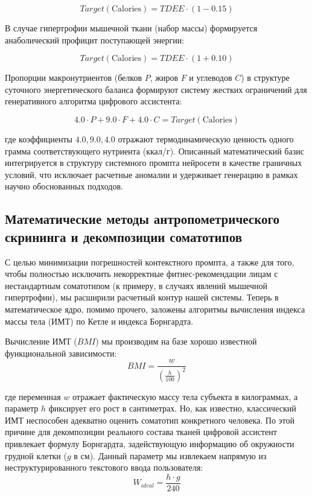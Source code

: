 \documentclass[14pt, a4paper]{extarticle}
\begin{document}
\begin{equation}\label{loss}
Target(\text{Calories}) = TDEE \cdot (1 - 0.15)
\end{equation}

В случае гипертрофии мышечной ткани (набор массы) формируется анаболический профицит поступающей энергии:

\begin{equation}\label{gain}
Target(\text{Calories}) = TDEE \cdot (1 + 0.10)
\end{equation}

Пропорции макронутриентов (белков $P$, жиров $F$ и углеводов $C$) в структуре суточного энергетического баланса формируют систему жестких ограничений для генеративного алгоритма цифрового ассистента:

\begin{equation}\label{pfc}
4.0 \cdot P + 9.0 \cdot F + 4.0 \cdot C = Target(\text{Calories})
\end{equation}

где коэффициенты $4.0, 9.0, 4.0$ отражают термодинамическую ценность одного грамма соответствующего нутриента (ккал/г). Описанный математический базис интегрируется в структуру системного промпта нейросети в качестве граничных условий, что исключает расчетные аномалии и удерживает генерацию в рамках научно обоснованных подходов.


\subsection{Математические методы антропометрического скрининга и декомпозиции соматотипов}

С целью минимизации погрешностей контекстного промпта, а также для того, чтобы полностью исключить некорректные фитнес-рекомендации лицам с нестандартным соматотипом (к примеру, в случаях явлений мышечной гипертрофии), мы расширили расчетный контур нашей системы. Теперь в математическое ядро, помимо прочего, заложены алгоритмы вычисления индекса массы тела (ИМТ) по Кетле и индекса Борнгардта.

Вычисление ИМТ ($BMI$) мы производим на базе хорошо известной функциональной зависимости:
\begin{equation}
BMI = \frac{w}{\left(\frac{h}{100}\right)^2}
\end{equation}

где переменная $w$ отражает фактическую массу тела субъекта в килограммах, а параметр $h$ фиксирует его рост в сантиметрах. Но, как известно, классический ИМТ неспособен адекватно оценить соматотип конкретного человека. По этой причине для декомпозиции реального состава тканей цифровой ассистент привлекает формулу Борнгардта, задействующую информацию об окружности грудной клетки ($g$ в см). Данный параметр мы извлекаем напрямую из неструктурированного текстового ввода пользователя:
\begin{equation}
W_{ideal} = \frac{h \cdot g}{240}
\end{equation}
\end{document}
